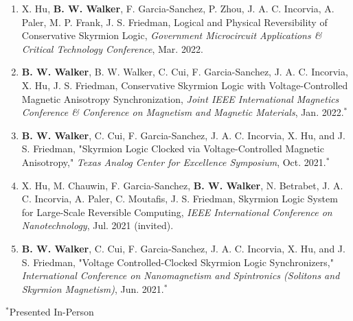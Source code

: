 \documentclass[letterpaper,11pt]{article}
\begin{document}
\begin{itemize}[leftmargin=0.15in, label={}]
{{\begin{enumerate}[leftmargin=0.15in]
          \item \small{X. Hu, \textbf{B. W. Walker}, F. Garcia-Sanchez, P. Zhou, J. A. C. Incorvia, A. Paler, M. P. Frank, J. S. Friedman, Logical and Physical Reversibility of Conservative Skyrmion Logic, \textit{Government Microcircuit Applications \& Critical Technology Conference}, Mar. 2022.}
          \item \small{\textbf{B. W. Walker}, B. W. Walker, C. Cui, F. Garcia-Sanchez, J. A. C. Incorvia, X. Hu, J. S. Friedman, Conservative Skyrmion Logic with Voltage-Controlled Magnetic Anisotropy Synchronization, \textit{Joint IEEE International Magnetics Conference \& Conference on Magnetism and Magnetic Materials}, Jan. 2022.$^{*}$}
          \item \small{\textbf{B. W. Walker}, C. Cui, F. Garcia-Sanchez, J. A. C. Incorvia, X. Hu, and J. S. Friedman, "Skyrmion Logic Clocked via Voltage-Controlled Magnetic Anisotropy," \textit{Texas Analog Center for Excellence Symposium}, Oct. 2021.$^{*}$}
          \item \small{X. Hu, M. Chauwin, F. Garcia-Sanchez, \textbf{B. W. Walker}, N. Betrabet, J. A. C. Incorvia, A. Paler, C. Moutafis, J. S. Friedman, Skyrmion Logic System for Large-Scale Reversible Computing, \textit{IEEE International Conference on Nanotechnology}, Jul. 2021 (invited).}
          \item \small{\textbf{B. W. Walker}, C. Cui, F. Garcia-Sanchez, J. A. C. Incorvia, X. Hu, and J. S. Friedman, "Voltage Controlled-Clocked Skyrmion Logic Synchronizers," \textit{International Conference on Nanomagnetism and Spintronics (Solitons and Skyrmion Magnetism)}, Jun. 2021.$^{*}$}
        \end{enumerate}
        }}
     \end{itemize}
     \vspace{-15pt}\hspace{400pt}$^{*}$Presented In-Person\vspace{-15pt}
\end{document}
